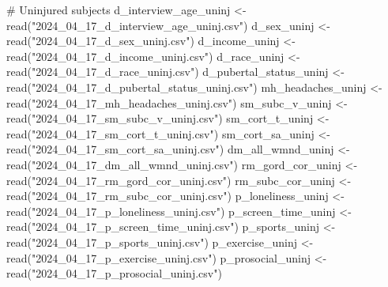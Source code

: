 \documentclass[
  letterpaper,
  DIV=11,
  numbers=noendperiod]{scrreprt}
\newenvironment{Shaded}{\begin{snugshade}}{\end{snugshade}}
\newcommand{\CommentTok}[1]{\textcolor[rgb]{0.37,0.37,0.37}{#1}}
\newcommand{\FunctionTok}[1]{\textcolor[rgb]{0.28,0.35,0.67}{#1}}
\newcommand{\NormalTok}[1]{\textcolor[rgb]{0.00,0.23,0.31}{#1}}
\newcommand{\OtherTok}[1]{\textcolor[rgb]{0.00,0.23,0.31}{#1}}
\newcommand{\StringTok}[1]{\textcolor[rgb]{0.13,0.47,0.30}{#1}}
\begin{document}
\begin{Shaded}
\begin{Highlighting}[]
\CommentTok{\# Uninjured subjects}
\NormalTok{d\_interview\_age\_uninj }\OtherTok{\textless{}{-}} \FunctionTok{read}\NormalTok{(}\StringTok{"2024\_04\_17\_d\_interview\_age\_uninj.csv"}\NormalTok{)}
\NormalTok{d\_sex\_uninj }\OtherTok{\textless{}{-}} \FunctionTok{read}\NormalTok{(}\StringTok{"2024\_04\_17\_d\_sex\_uninj.csv"}\NormalTok{)}
\NormalTok{d\_income\_uninj }\OtherTok{\textless{}{-}} \FunctionTok{read}\NormalTok{(}\StringTok{"2024\_04\_17\_d\_income\_uninj.csv"}\NormalTok{)}
\NormalTok{d\_race\_uninj }\OtherTok{\textless{}{-}} \FunctionTok{read}\NormalTok{(}\StringTok{"2024\_04\_17\_d\_race\_uninj.csv"}\NormalTok{)}
\NormalTok{d\_pubertal\_status\_uninj }\OtherTok{\textless{}{-}} \FunctionTok{read}\NormalTok{(}\StringTok{"2024\_04\_17\_d\_pubertal\_status\_uninj.csv"}\NormalTok{)}
\NormalTok{mh\_headaches\_uninj }\OtherTok{\textless{}{-}} \FunctionTok{read}\NormalTok{(}\StringTok{"2024\_04\_17\_mh\_headaches\_uninj.csv"}\NormalTok{)}
\NormalTok{sm\_subc\_v\_uninj }\OtherTok{\textless{}{-}} \FunctionTok{read}\NormalTok{(}\StringTok{"2024\_04\_17\_sm\_subc\_v\_uninj.csv"}\NormalTok{)}
\NormalTok{sm\_cort\_t\_uninj }\OtherTok{\textless{}{-}} \FunctionTok{read}\NormalTok{(}\StringTok{"2024\_04\_17\_sm\_cort\_t\_uninj.csv"}\NormalTok{)}
\NormalTok{sm\_cort\_sa\_uninj }\OtherTok{\textless{}{-}} \FunctionTok{read}\NormalTok{(}\StringTok{"2024\_04\_17\_sm\_cort\_sa\_uninj.csv"}\NormalTok{)}
\NormalTok{dm\_all\_wmnd\_uninj }\OtherTok{\textless{}{-}} \FunctionTok{read}\NormalTok{(}\StringTok{"2024\_04\_17\_dm\_all\_wmnd\_uninj.csv"}\NormalTok{)}
\NormalTok{rm\_gord\_cor\_uninj }\OtherTok{\textless{}{-}} \FunctionTok{read}\NormalTok{(}\StringTok{"2024\_04\_17\_rm\_gord\_cor\_uninj.csv"}\NormalTok{)}
\NormalTok{rm\_subc\_cor\_uninj }\OtherTok{\textless{}{-}} \FunctionTok{read}\NormalTok{(}\StringTok{"2024\_04\_17\_rm\_subc\_cor\_uninj.csv"}\NormalTok{)}
\NormalTok{p\_loneliness\_uninj }\OtherTok{\textless{}{-}} \FunctionTok{read}\NormalTok{(}\StringTok{"2024\_04\_17\_p\_loneliness\_uninj.csv"}\NormalTok{)}
\NormalTok{p\_screen\_time\_uninj }\OtherTok{\textless{}{-}} \FunctionTok{read}\NormalTok{(}\StringTok{"2024\_04\_17\_p\_screen\_time\_uninj.csv"}\NormalTok{)}
\NormalTok{p\_sports\_uninj }\OtherTok{\textless{}{-}} \FunctionTok{read}\NormalTok{(}\StringTok{"2024\_04\_17\_p\_sports\_uninj.csv"}\NormalTok{)}
\NormalTok{p\_exercise\_uninj }\OtherTok{\textless{}{-}} \FunctionTok{read}\NormalTok{(}\StringTok{"2024\_04\_17\_p\_exercise\_uninj.csv"}\NormalTok{)}
\NormalTok{p\_prosocial\_uninj }\OtherTok{\textless{}{-}} \FunctionTok{read}\NormalTok{(}\StringTok{"2024\_04\_17\_p\_prosocial\_uninj.csv"}\NormalTok{)}

\end{Highlighting}
\end{Shaded}
\end{document}
